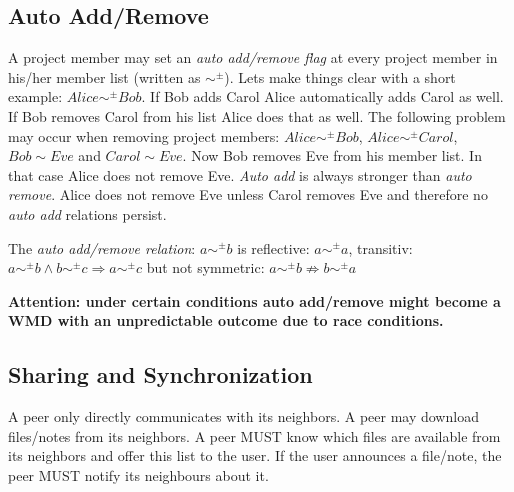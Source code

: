 \subsection{Auto Add/Remove}
A project member may set an \emph{auto add/remove flag} at every project member in his/her member list (written as $\sim ^\pm$). Lets make things clear with a short example: $Alice \sim ^\pm Bob$. If Bob adds Carol Alice automatically adds Carol as well. If Bob removes Carol from his list Alice does that as well. The following problem may occur when removing project members: $Alice \sim ^\pm Bob$, $Alice \sim ^\pm  Carol$, $Bob \sim Eve$ and $Carol \sim Eve$. Now Bob removes Eve from his member list. In that case Alice does not remove Eve. 
\emph{Auto add} is always stronger than \emph{auto remove}. Alice does not remove Eve unless Carol removes Eve and therefore no \emph{auto add} relations persist. 

The \emph{auto add/remove relation}: $a \sim ^\pm b$ is reflective: $a \sim ^\pm a$, transitiv: $a \sim ^\pm b \wedge b\sim ^\pm c \Rightarrow a \sim ^\pm c$ but not symmetric: $a \sim ^\pm b \not\Rightarrow b \sim ^\pm a$


\textbf{Attention: under certain conditions auto add/remove might become a WMD with an unpredictable outcome due to race conditions.} 


\subsection{Sharing and Synchronization}
A peer only directly communicates with its neighbors. A peer may download files/notes from its neighbors. A peer MUST know which files are available from its neighbors and offer this list to the user. If the user announces a file/note, the peer MUST notify its neighbours about it.

